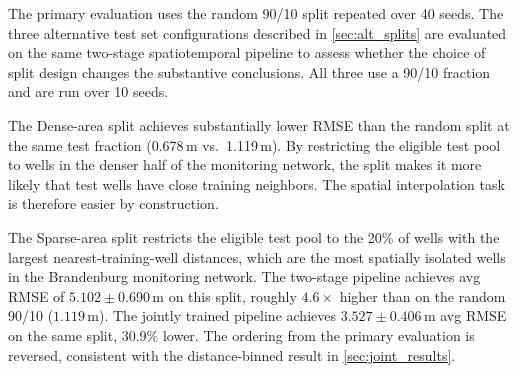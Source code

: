 The primary evaluation uses the random 90/10 split repeated over 40 seeds. The three alternative
test set configurations described in \cref{sec:alt_splits} are evaluated on the same two-stage spatiotemporal pipeline
to assess whether the choice of split design changes the substantive conclusions.
All three use a 90/10 fraction and are run over 10 seeds.

\begin{table}[htbp]
\centering
{}
\caption{Two-stage pipeline under alternative split strategies (alternatives: 10 seeds each; primary: 40 seeds; lower is better)}
\label{tab:split_sensitivity}
\end{table}

The Dense-area split achieves substantially lower RMSE than the random split at the same test
fraction (0.678\,m vs.\ 1.119\,m). By restricting the eligible test pool to wells in
the denser half of the monitoring network, the split makes it more likely that test wells have
close training neighbors. The spatial interpolation task is therefore easier by construction.

The Sparse-area split restricts the eligible test pool to the 20\% of wells with the largest
nearest-training-well distances, which are the most spatially isolated wells in the Brandenburg
monitoring network. The two-stage pipeline achieves avg RMSE of $5.102 \pm 0.690$\,m on this
split, roughly $4.6\times$ higher than on the random 90/10 ($1.119$\,m). The jointly trained
pipeline achieves $3.527 \pm 0.406$\,m avg RMSE on the same split, 30.9\% lower. The
ordering from the primary evaluation is reversed, consistent with the distance-binned result in
\cref{sec:joint_results}.

